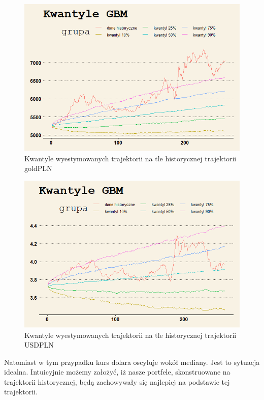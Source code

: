 \documentclass[12pt]{article}
\begin{document}
\newpage
\begin{figure}[ht!]
\centering
\includegraphics[width=\linewidth]{kwantyle_GBM_GOLDPLN.png}
\caption{Kwantyle wyestymowanych trajektorii na tle historycznej trajektorii goldPLN}
\end{figure}
\newpage

\newpage
\begin{figure}[ht!]
\centering
\includegraphics[width=\linewidth]{kwantyle_GBM_USDPLN.png}
\caption{Kwantyle wyestymowanych trajektorii na tle historycznej trajektorii USDPLN}
\end{figure}

Natomiast w tym przypadku kurs dolara oscyluje wokół mediany. Jest to sytuacja idealna. Intuicyjnie możemy założyć, iż nasze portfele, skonstruowane na trajektorii historycznej, będą zachowywały się najlepiej na podstawie tej trajektorii.
\end{document}
